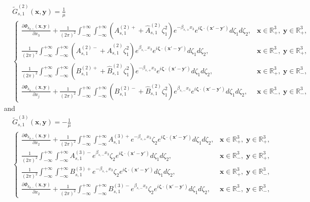 \documentclass[final,reqno]{siamltex}
\newcommand{\pa}{\partial}
\newcommand{\wid}{\widetilde}
\newcommand{\mat}{\mathbb}
\newcommand{\R}{{\mat R}}
\begin{document}
\begin{align*}
&\wid G_{s,1}^{(2)}(\mathbf{x},\mathbf{y})=\frac{1}{\mu} \\
&\left\{
\begin{array}{ll}
	\displaystyle\frac{\pa\Phi_{k_{p,+}}(\mathbf{x},\mathbf{y})}{\pa x_3}+\frac{1}{(2\pi)^2}\int_{-\infty}^{+\infty}\int_{-\infty}^{+\infty}(A_{s,1}^{(2)+}+\hat A_{s,1}^{(2)}\zeta_1^2)e^{-\beta_{s,+}x_3}e^{i\boldsymbol{\zeta}\cdot(\mathbf{x}'-\mathbf{y}')}d\zeta_1d\zeta_2,&\mathbf{x}\in\R^3_+,\;\mathbf{y}\in\R^3_+,\\
	\displaystyle\frac{1}{(2\pi)^2}\int_{-\infty}^{+\infty}\int_{-\infty}^{+\infty}(A_{s,1}^{(2)-}+\hat A_{s,1}^{(2)}\zeta_1^2)e^{\beta_{s,-}x_3}e^{i\boldsymbol{\zeta}\cdot(\mathbf{x}'-\mathbf{y}')}d\zeta_1d\zeta_2,&\mathbf{x}\in\R^3_-,\;\mathbf{y}\in\R^3_+, \\
	\displaystyle\frac{1}{(2\pi)^2}\int_{-\infty}^{+\infty}\int_{-\infty}^{+\infty}(B_{s,1}^{(2)+}+\hat B_{s,1}^{(2)}\zeta_1^2)e^{-\beta_{s,+}x_3}e^{i\boldsymbol{\zeta}\cdot(\mathbf{x}'-\mathbf{y}')}d\zeta_1d\zeta_2,&\mathbf{x}\in\R^3_+,\;\mathbf{y}\in\R^3_-, \\
	\displaystyle\frac{\pa\Phi_{k_{p,-}}(\mathbf{x},\mathbf{y})}{\pa x_j}+\frac{1}{(2\pi)^2}\int_{-\infty}^{+\infty}\int_{-\infty}^{+\infty}(B_{s,1}^{(2)-}+\hat B_{s,1}^{(2)}\zeta_1^2)e^{\beta_{s,-}x_3}e^{i\boldsymbol{\zeta}\cdot(\mathbf{x}'-\mathbf{y}')}d\zeta_1d\zeta_2,&\mathbf{x}\in\R^3_-,\;\mathbf{y}\in\R^3_-, 
\end{array}
\right.
\end{align*}
and 
\begin{align*}
&\wid G_{s,1}^{(3)}(\mathbf{x},\mathbf{y})=-\frac{1}{\mu} \\
&\left\{
\begin{array}{ll}
	\displaystyle\frac{\pa\Phi_{k_{p,+}}(\mathbf{x},\mathbf{y})}{\pa x_2}+\frac{1}{(2\pi)^2}\int_{-\infty}^{+\infty}\int_{-\infty}^{+\infty}A_{s,1}^{(3)+}e^{-\beta_{s,+}x_3}\zeta_2e^{i\boldsymbol{\zeta}\cdot(\mathbf{x}'-\mathbf{y}')}d\zeta_1d\zeta_2,&\mathbf{x}\in\R^3_+,\;\mathbf{y}\in\R^3_+,\\
	\displaystyle\frac{1}{(2\pi)^2}\int_{-\infty}^{+\infty}\int_{-\infty}^{+\infty}A_{s,1}^{(3)-}e^{\beta_{s,-}x_3}\zeta_2e^{i\boldsymbol{\zeta}\cdot(\mathbf{x}'-\mathbf{y}')}d\zeta_1d\zeta_2,&\mathbf{x}\in\R^3_-,\;\mathbf{y}\in\R^3_+, \\
	\displaystyle\frac{1}{(2\pi)^2}\int_{-\infty}^{+\infty}\int_{-\infty}^{+\infty}B_{s,1}^{(3)+}e^{-\beta_{s,+}x_3}\zeta_2e^{i\boldsymbol{\zeta}\cdot(\mathbf{x}'-\mathbf{y}')}d\zeta_1d\zeta_2,&\mathbf{x}\in\R^3_+,\;\mathbf{y}\in\R^3_-, \\
	\displaystyle\frac{\pa\Phi_{k_{p,-}}(\mathbf{x},\mathbf{y})}{\pa x_2}+\frac{1}{(2\pi)^2}\int_{-\infty}^{+\infty}\int_{-\infty}^{+\infty}B_{s,1}^{(3)-}e^{\beta_{s,-}x_3}\zeta_2e^{i\boldsymbol{\zeta}\cdot(\mathbf{x}'-\mathbf{y}')}d\zeta_1d\zeta_2,&\mathbf{x}\in\R^3_-,\;\mathbf{y}\in\R^3_-, 
\end{array}
\right.
\end{align*}
\end{document}
